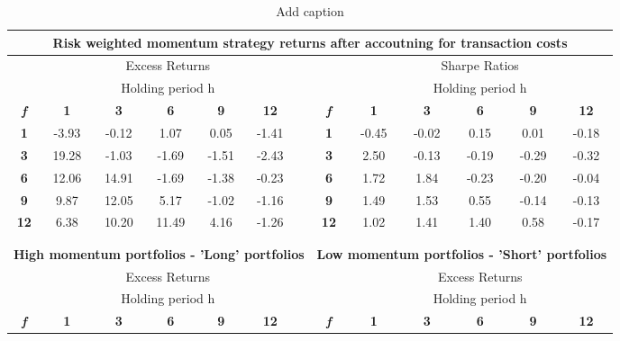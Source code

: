 \documentclass{article}
\begin{document}
\begin{table}[htbp]
  \centering
  \caption{Add caption}
    \begin{tabular}{ccccccccccccc}
    \multicolumn{13}{c}{Risk weighted momentum strategy returns after accoutning for transaction costs} \\
    \midrule
          & \multicolumn{5}{c}{Excess Returns}    &       &       & \multicolumn{5}{c}{Sharpe Ratios} \\
\cmidrule{2-6}\cmidrule{9-13}          & \multicolumn{5}{c}{Holding period h}  &       &       & \multicolumn{5}{c}{Holding period h} \\
    \textit{\textbf{f}} & \textbf{1} & \textbf{3} & \textbf{6} & \textbf{9} & \textbf{12} &       & \textit{\textbf{f}} & \textbf{1} & \textbf{3} & \textbf{6} & \textbf{9} & \textbf{12} \\
\cmidrule{2-6}\cmidrule{9-13}    \textbf{1} & -3.93 & -0.12 & 1.07  & 0.05  & -1.41 &       & \textbf{1} & -0.45 & -0.02 & 0.15  & 0.01  & -0.18 \\
    \textbf{3} & 19.28 & -1.03 & -1.69 & -1.51 & -2.43 &       & \textbf{3} & 2.50  & -0.13 & -0.19 & -0.29 & -0.32 \\
    \textbf{6} & 12.06 & 14.91 & -1.69 & -1.38 & -0.23 &       & \textbf{6} & 1.72  & 1.84  & -0.23 & -0.20 & -0.04 \\
    \textbf{9} & 9.87  & 12.05 & 5.17  & -1.02 & -1.16 &       & \textbf{9} & 1.49  & 1.53  & 0.55  & -0.14 & -0.13 \\
    \textbf{12} & 6.38  & 10.20 & 11.49 & 4.16  & -1.26 &       & \textbf{12} & 1.02  & 1.41  & 1.40  & 0.58  & -0.17 \\
    \midrule
          &       &       &       &       &       &       &       &       &       &       &       &  \\
          &       &       &       &       &       &       &       &       &       &       &       &  \\
    \multicolumn{7}{c}{\textbf{High momentum portfolios - 'Long' portfolios}} & \multicolumn{6}{c}{\textbf{Low momentum portfolios - 'Short' portfolios}} \\
    \midrule
          & \multicolumn{5}{c}{Excess Returns}    &       &       & \multicolumn{5}{c}{Excess Returns} \\
\cmidrule{2-6}\cmidrule{9-13}          & \multicolumn{5}{c}{Holding period h}  &       &       & \multicolumn{5}{c}{Holding period h} \\
    \textit{\textbf{f}} & \textbf{1} & \textbf{3} & \textbf{6} & \textbf{9} & \textbf{12} &       & \textit{\textbf{f}} & \textbf{1} & \textbf{3} & \textbf{6} & \textbf{9} & \textbf{12} \\

\end{tabular}
\end{table}
\end{document}
